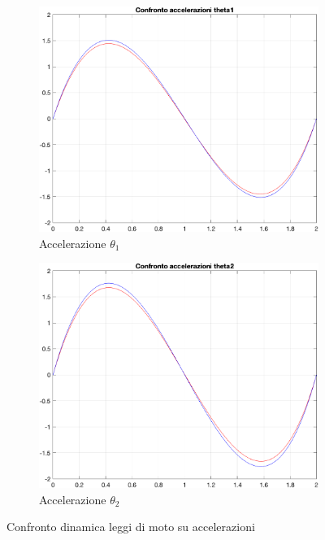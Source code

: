 \begin{figure}[!ht]
\begin{subfigure}{.45\textwidth}
  \centering
  \includegraphics[width=.78\linewidth]{Immagini/Dinamica/confracct1.png}  
  \caption{Accelerazione $\theta_1$}
  \label{fig:sub-first}
\end{subfigure}
\begin{subfigure}{.45\textwidth}
  \centering
  \includegraphics[width=.78\linewidth]{Immagini/Dinamica/confracct2.png}  
  \caption{Accelerazione $\theta_2$}
  \label{fig:sub-second}
\end{subfigure}
\caption{Confronto dinamica leggi di moto su accelerazioni}
\end{figure}
